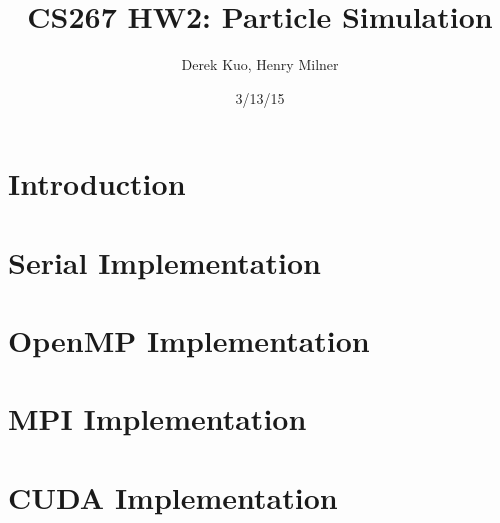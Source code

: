 \documentclass{article}
\author{Derek Kuo, Henry Milner}
\title{CS267 HW2: Particle Simulation}
\date{3/13/15}
\begin{document}
\maketitle

\section{Introduction}

\section{Serial Implementation}

\section{OpenMP Implementation}

\section{MPI Implementation}

\section{CUDA Implementation}
\end{document}
